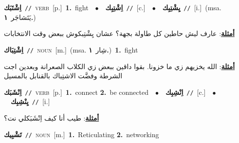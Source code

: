 \documentclass[10pt,a4paper,twoside]{article} %
\begin{document}
\begin{multicols}{2}
{\setlength\topsep{0pt}\textbf{\foreignlanguage{arabic}{اِشْتَبَك}}\ {\color{gray}\texttt{//}\color{black}}\ \textsc{verb}\ [p.]\ \textbf{1.}~fight\ \ $\bullet$\ \ \setlength\topsep{0pt}\textbf{\foreignlanguage{arabic}{اِشْتِبِك}}\ {\color{gray}\texttt{//}\color{black}}\ [c.]\ \ $\bullet$\ \ \setlength\topsep{0pt}\textbf{\foreignlanguage{arabic}{يِشْتِبِك}}\ {\color{gray}\texttt{//}\color{black}}\ [i.]\ \color{gray}(msa. \foreignlanguage{arabic}{يَتَشاجَر}~\foreignlanguage{arabic}{\textbf{١.}})\color{black}\  \begin{flushright}\color{gray}\foreignlanguage{arabic}{\textbf{\underline{\foreignlanguage{arabic}{أمثلة}}}: عارف ليش حاطين كل طاولة بجهة؟ عشان يِشْتِبكوش ببعض وقت الانتخابات}\end{flushright}\color{black}} \vspace{2mm}

{\setlength\topsep{0pt}\textbf{\foreignlanguage{arabic}{اِشْتِبَاك}}\ {\color{gray}\texttt{//}\color{black}}\ \textsc{noun}\ [m.]\ \color{gray}(msa. \foreignlanguage{arabic}{شِار}~\foreignlanguage{arabic}{\textbf{١.}})\color{black}\ \textbf{1.}~fight\  \begin{flushright}\color{gray}\foreignlanguage{arabic}{\textbf{\underline{\foreignlanguage{arabic}{أمثلة}}}: الله يخزيهم زي ما خزونا. بقوا داقين ببعض زي الكلاب الصعرانة وبعدين اجت الشرطة وفضَّت الاشتِباك بالقنابل بالمسيل}\end{flushright}\color{black}} \vspace{2mm}

{\setlength\topsep{0pt}\textbf{\foreignlanguage{arabic}{اِنْشَبَك}}\ {\color{gray}\texttt{//}\color{black}}\ \textsc{verb}\ [p.]\ \textbf{1.}~connect  \textbf{2.}~be connected\ \ $\bullet$\ \ \setlength\topsep{0pt}\textbf{\foreignlanguage{arabic}{اِنْشِبِك}}\ {\color{gray}\texttt{//}\color{black}}\ [c.]\ \ $\bullet$\ \ \setlength\topsep{0pt}\textbf{\foreignlanguage{arabic}{يِنْشِبِك}}\ {\color{gray}\texttt{//}\color{black}}\ [i.]\  \begin{flushright}\color{gray}\foreignlanguage{arabic}{\textbf{\underline{\foreignlanguage{arabic}{أمثلة}}}: طيب أنا كيف اِنْشَبَكلي نت؟}\end{flushright}\color{black}} \vspace{2mm}

{\setlength\topsep{0pt}\textbf{\foreignlanguage{arabic}{تَشْبِيك}}\ {\color{gray}\texttt{//}\color{black}}\ \textsc{noun}\ [m.]\ \textbf{1.}~Reticulating  \textbf{2.}~networking\ } \vspace{2mm}


\end{multicols}
\end{document}
